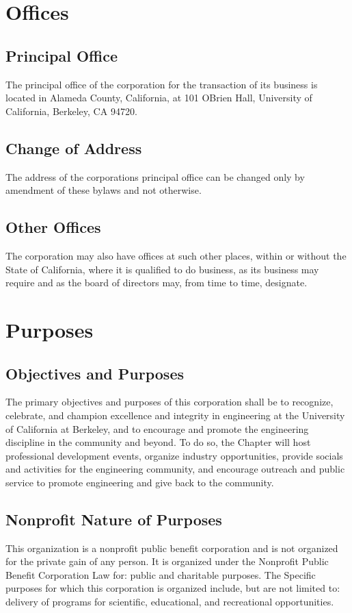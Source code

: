 \documentclass{article}
\begin{document}
	\section{Offices}
	\subsection{Principal Office}
	The principal office of the corporation for the transaction of its business is located in Alameda County, California, at 101 O\textquotesingle Brien Hall, University of California, Berkeley, CA 94720.
	\subsection{Change of Address}
	The address of the corporation\textquotesingle s principal office can be changed only by amendment of these bylaws and not otherwise.
	
	\subsection{Other Offices}
	The corporation may also have offices at such other places, within or without the State of California, where it is qualified to do business, as its business may require and as the board of directors may, from time to time, designate.
	
	\section{Purposes}
	\subsection{Objectives and Purposes}
	The primary objectives and purposes of this corporation shall be to recognize, celebrate, and champion excellence and integrity in engineering at the University of California at Berkeley, and to encourage and promote the engineering discipline in the community and beyond. To do so, the Chapter will host professional development events, organize industry opportunities, provide socials and activities for the engineering community, and encourage outreach and public service to promote engineering and give back to the community.
	\subsection{Nonprofit Nature of Purposes}
	This organization is a nonprofit public benefit corporation and is not organized for the private gain of any person. It is organized under the Nonprofit Public Benefit Corporation Law for: public and charitable purposes. The Specific purposes for which this corporation is organized include, but are not limited to: delivery of programs for scientific, educational, and recreational opportunities.
	
\end{document}
